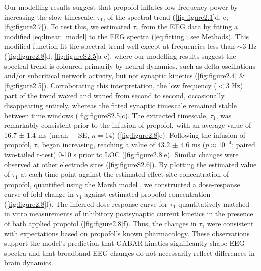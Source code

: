 Our modelling results suggest that propofol inflates low frequency power by increasing the slow timescale, $\tau_1$, of the spectral trend (\autoref{fig:figure2.1}d, e; \autoref{fig:figure2.7}). To test this, we estimated $\tau_1$ from the EEG data by fitting a modified \ref{eq:linear_model} to the EEG spectra (\ref{eq:fitting}; see Methods). This modified function fit the spectral trend well except at frequencies less than ${\sim}3$ \unit{\hertz} (\autoref{fig:figure2.8}d; \autoref{fig:figureS2.5}a-c), where our modelling results suggest the spectral trend is coloured primarily by neural dynamics, such as delta oscillations and/or subcritical network activity, but not synaptic kinetics (\autoref{fig:figure2.4} \& \ref{fig:figure2.5}). Corroborating this interpretation, the low frequency ($<3$ \unit{\hertz}) part of the trend waxed and waned from second to second, occasionally disappearing entirely, whereas the fitted synaptic timescale remained stable between time windows (\autoref{fig:figureS2.5}c). The extracted timescale, $\tau_1$, was remarkably consistent prior to the infusion of propofol, with an average value of 16.7 ± 1.4 ms (mean $\pm$ SE, $n=14$) (\autoref{fig:figure2.8}e). Following the infusion of propofol, $\tau_1$ began increasing, reaching a value of 43.2 $\pm$ 4.6 \unit{\milli\second} ($p \approx 10^{-4}$; paired two-tailed t-test) 0-10 \unit{\second} prior to LOC (\autoref{fig:figure2.8}e). Similar changes were observed at other electrode sites (\autoref{fig:figureS2.6}). By plotting the estimated value of $\tau_1$ at each time point against the estimated effect-site concentration of propofol, quantified using the Marsh model \cite{Marsh1991}, we constructed a dose-response curve of fold change in $\tau_1$ against estimated propofol concentration (\autoref{fig:figure2.8}f). The inferred dose-response curve for $\tau_1$ quantitatively matched in vitro measurements of inhibitory postsynaptic current kinetics in the presence of bath applied propofol \cite{Kitamura2003, Orser1994, Whittington1996} (\autoref{fig:figure2.8}f). Thus, the changes in $\tau_1$ were consistent with expectations based on propofol’s known pharmacology. These observations support the model’s prediction that GABAR kinetics significantly shape EEG spectra and that broadband EEG changes do not necessarily reflect differences in brain dynamics. 


